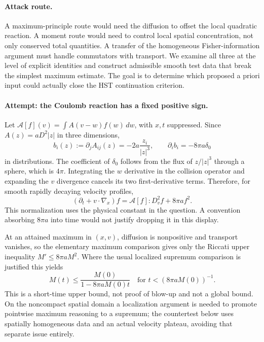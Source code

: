 \documentclass[11pt,a4paper]{article}
\numberwithin{equation}{section}
\begin{document}
\paragraph{Attack route.}
A maximum-principle route would need the diffusion to offset the local
quadratic reaction. A moment route would need to control local spatial
concentration, not only conserved total quantities. A transfer of the
homogeneous Fisher-information argument must handle commutators with
transport. We examine all three at the level of explicit identities and
construct admissible smooth test data that break the simplest maximum
estimate. The goal is to determine which proposed a priori input could
actually close the HST continuation criterion.

\paragraph{Attempt: the Coulomb reaction has a fixed positive sign.}
Let $\mathcal A[f](v)=\int A(v-w)f(w)\,dw$, with $x,t$ suppressed.
Since $A(z)=aD^2|z|$ in three dimensions,
\[
 b_i(z):=\partial_jA_{ij}(z)=-2a\frac{z_i}{|z|^3},
 \qquad \partial_i b_i=-8\pi a\delta_0
\]
in distributions. The coefficient of $\delta_0$ follows from the flux of
$z/|z|^3$ through a sphere, which is $4\pi$.
Integrating the $w$ derivative in the collision operator and expanding
the $v$ divergence cancels its two first-derivative terms. Therefore, for
smooth rapidly decaying velocity profiles,
\begin{equation}\label{eq179-nondiv}
 (\partial_t+v\cdot\nabla_x)f
       =\mathcal A[f]:D_v^2f+8\pi a f^2.
\end{equation}
This normalization uses the physical constant in the question. A convention
absorbing $8\pi a$ into time would not justify dropping it in this display.

At an attained maximum in $(x,v)$, diffusion is nonpositive and transport
vanishes, so the elementary maximum comparison gives only the Riccati
upper inequality $M'\le8\pi a M^2$. Where the usual localized supremum
comparison is justified this yields
\[
       M(t)\le\frac{M(0)}{1-8\pi a M(0)t}
          \quad\text{for }t<(8\pi aM(0))^{-1}.
\]
This is a short-time upper bound, not proof of blow-up and not a global
bound. On the noncompact spatial domain a localization argument is needed
to promote pointwise maximum reasoning to a supremum; the countertest below
uses spatially homogeneous data and an actual velocity plateau, avoiding
that separate issue entirely.
\end{document}

